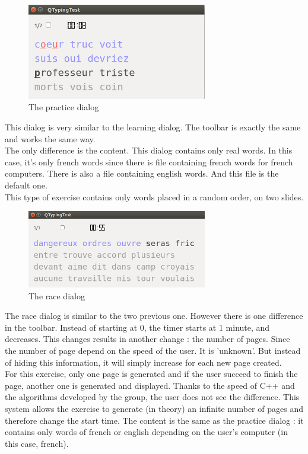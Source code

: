 \begin{figure}[H]
	\centering
	\includegraphics[width=0.7\textwidth]{images/dialog-practice.png}
	 \caption{The practice dialog}
	 \label{dialog-practice}
\end{figure}

This dialog is very similar to the learning dialog. The toolbar is exactly the same and works the same way.\\
The only difference is the content. This dialog contains only real words. In this case, it's only french words since there is file containing french words for french computers. There is also a file containing english words. And this file is the default one.\\
This type of exercise contains only words placed in a random order, on two slides.

\begin{figure}[H]
	\centering
	\includegraphics[width=0.7\textwidth]{images/dialog-race.png}
	 \caption{The race dialog}
	 \label{dialog-race}
\end{figure}

The race dialog is similar to the two previous one. However there is one difference in the toolbar. Instead of starting at 0, the timer starts at 1 minute, and decreases. This changes results in another change : the number of pages. Since the number of page depend on the speed of the user. It is 'unknown'. But instead of hiding this information, it will simply increase for each new page created.\\
For this exercise, only one page is generated and if the user succeed to finish the page, another one is generated and displayed. Thanks to the speed of C++ and the algorithms developed by the group, the user does not see the difference. This system allows the exercise to generate (in theory) an infinite number of pages and therefore change the start time.
The content is the same as the practice dialog : it contains only words of french or english depending on the user's computer (in this case, french).\\

